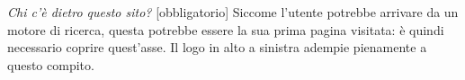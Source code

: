 \textit{Chi c'è dietro questo sito?} [obbligatorio]\newline
Siccome l'utente potrebbe arrivare da un motore di ricerca, questa potrebbe essere la sua prima pagina visitata: è quindi necessario coprire quest'asse. Il logo in alto a sinistra adempie pienamente a questo compito.